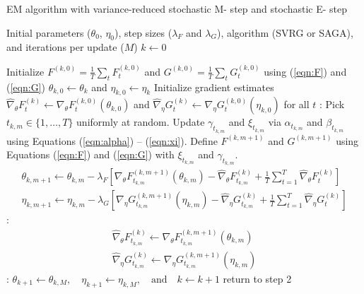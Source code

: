 \begin{algorithm}
\caption{EM algorithm with variance-reduced stochastic M- step and stochastic E- step}\label{alg:P-EM-SO}
\begin{algorithmic}[1]
\Require Initial parameters ($\theta_{0}$, $\eta_{0}$), step sizes ($\lambda_F$ and $\lambda_G$), algorithm (SVRG or SAGA), and iterations per update ($M$)
%
\State $k \gets 0$

%
\State Initialize $F^{(k,0)} = \frac{1}{T} \sum_t F_t^{(k,0)}$ and $G^{(k,0)} = \frac{1}{T} \sum_t G_t^{(k,0)}$ using (\ref{eqn:F}) and (\ref{eqn:G})
%
\vspace{10pt}
%
\State $\theta_{k,0} \gets \theta_k$ and $\eta_{k,0} \gets \eta_k$
%
\State Initialize gradient estimates $\widehat \nabla_\theta F_t^{(k)} \gets \nabla_\theta F_t^{(k,0)} (\theta_{k,0})$ and $\widehat \nabla_\eta G_t^{(k)} \gets \nabla_\eta G_t^{(k,0)} (\eta_{k,0})$ for all $t$
%
:
    \State Pick $t_{k,m} \in \{1,\ldots,T\}$ uniformly at random.
    \State Update $\gamma_{t_{k,m}}$ and $\xi_{t_{k,m}}$ via $\alpha_{t_{k,m}}$ and $\beta_{t_{k,m}}$ using Equations (\ref{eqn:alpha}) -- (\ref{eqn:xi}).
    \State Define $F^{(k,m+1)}$ and $G^{(k,m+1)}$ using Equations (\ref{eqn:F}) and (\ref{eqn:G}) with $\xi_{t_{k,m}}$ and $\gamma_{t_{k,m}}$.
    \State {}
    \begin{gather}
        \theta_{k,m+1} \gets \theta_{k,m} - \lambda_F \left[\nabla_\theta F_{t_{k,m}}^{(k,m+1)}(\theta_{k,m}) - \widehat \nabla_\theta F_{t_{k,m}}^{(k)} + \frac{1}{T} \sum_{t=1}^T \widehat \nabla_\theta F^{(k)}_{t} \right] \\
        \eta_{k,m+1} \gets \eta_{k,m} - \lambda_G \left[\nabla_\eta G_{t_{k,m}}^{(k,m+1)}(\eta_{k,m}) - \widehat \nabla_\eta G_{t_{k,m}}^{(k)} + \frac{1}{T} \sum_{t=1}^T \widehat \nabla_\eta G^{(k)}_{t} \right]
    \end{gather}
    :
        \begin{gather}
            \widehat \nabla_\theta F_{t_{k,m}}^{(k)} \gets \nabla_\theta F_{t_{k,m}}^{(k,m+1)}(\theta_{k,m}) \\
            \widehat \nabla_\eta G_{t_{k,m}}^{(k)} \gets \nabla_\eta G_{t_{k,m}}^{(k,m+1)}(\eta_{k,m})
        \end{gather}
    \EndIf
\EndFor
%
\vspace{10pt}
%
:
    \State $\theta_{k+1} \gets \theta_{k,M}, \quad \eta_{k+1} \gets \eta_{k,M}, \quad \text{and} \quad k \gets k+1$
\EndIf
%
\vspace{10pt}
%
\State return to step 2
\end{algorithmic}
\end{algorithm}

